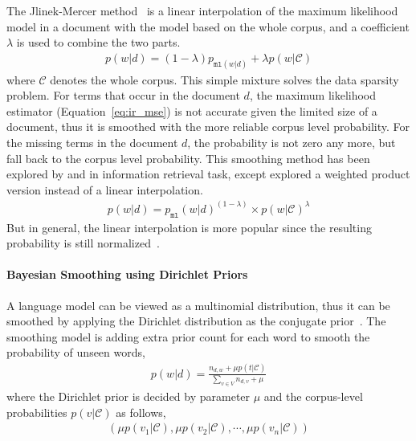 The Jlinek-Mercer method~\citep{Jelinek-1980} is a linear interpolation of the maximum likelihood model in a document with the model based on the whole corpus, and a coefficient $\lambda$ is used to combine the two parts.
\begin{align}
p(w|d) = (1 - \lambda) p_{\texttt{ml}(w|d)} + \lambda p(w|\mathcal{C})
\end{align}
where $\mathcal{C}$ denotes the whole corpus. This simple mixture solves the data sparsity problem. For terms that occur in the document $d$, the maximum likelihood estimator (Equation~\ref{eq:ir_mse}) is not accurate given the limited size of a document, thus it is smoothed with the more reliable corpus level probability. For the missing terms in the document $d$, the probability is not zero any more, but fall back to the corpus level probability. This smoothing method has been explored by \cite{PonteCroft} and \cite{song-99} in information retrieval task, except \cite{PonteCroft} explored a weighted product version instead of a linear interpolation.
\begin{align}
p(w|d) = p_{\texttt{ml}}(w|d)^{(1 - \lambda) } \times p(w|\mathcal{C})^{\lambda}
\label{eq:lm-jr}
\end{align}
But in general, the linear interpolation is more popular since the resulting probability is still normalized~\citep{song-99}.

\paragraph{Bayesian Smoothing using Dirichlet Priors}

A language model can be viewed as a multinomial distribution, thus it can be smoothed by applying the Dirichlet distribution as the conjugate prior~\citep{mackay95dirichlet}. The smoothing model is adding extra prior count for each word to smooth the probability of unseen words,
\begin{align}
p(w|d) = \frac{n_{d,w} + \mu p(t|\mathcal{C})}{\sum_{v \in V} n_{d,v} + \mu}
\end{align}
where the Dirichlet prior is decided by parameter $\mu$ and the corpus-level probabilities $p(v|\mathcal{C})$ as follows,
\begin{align}
(\mu p(v_1 | \mathcal{C}), \mu p(v_2 | \mathcal{C}), \cdots, \mu p(v_n | \mathcal{C}))
\label{eq:lm-bs}
\end{align}



